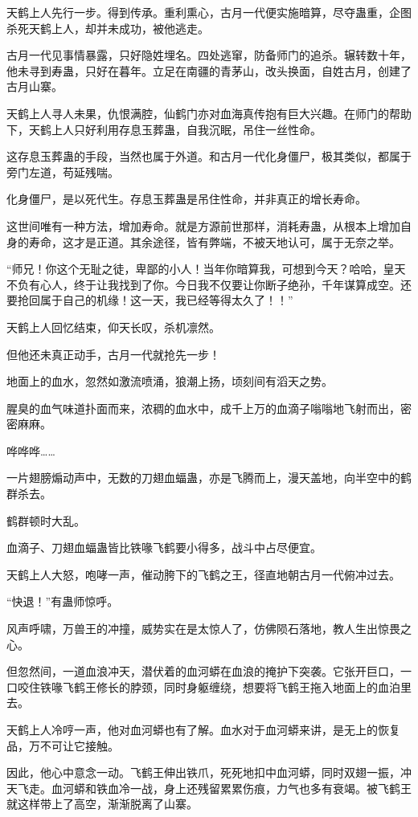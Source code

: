 \begin{this_body}
天鹤上人先行一步。得到传承。重利熏心，古月一代便实施暗算，尽夺蛊重，企图杀死天鹤上人，却并未成功，被他逃走。

古月一代见事情暴露，只好隐姓埋名。四处逃窜，防备师门的追杀。辗转数十年，他未寻到寿蛊，只好在暮年。立足在南疆的青茅山，改头换面，自姓古月，创建了古月山寨。

天鹤上人寻人未果，仇恨满腔，仙鹤门亦对血海真传抱有巨大兴趣。在师门的帮助下，天鹤上人只好利用存息玉葬蛊，自我沉眠，吊住一丝性命。

这存息玉葬蛊的手段，当然也属于外道。和古月一代化身僵尸，极其类似，都属于旁门左道，苟延残喘。

化身僵尸，是以死代生。存息玉葬蛊是吊住性命，并非真正的增长寿命。

这世间唯有一种方法，增加寿命。就是方源前世那样，消耗寿蛊，从根本上增加自身的寿命，这才是正道。其余途径，皆有弊端，不被天地认可，属于无奈之举。

“师兄！你这个无耻之徒，卑鄙的小人！当年你暗算我，可想到今天？哈哈，皇天不负有心人，终于让我找到了你。今日我不仅要让你断子绝孙，千年谋算成空。还要抢回属于自己的机缘！这一天，我已经等得太久了！！”

天鹤上人回忆结束，仰天长叹，杀机凛然。

但他还未真正动手，古月一代就抢先一步！

地面上的血水，忽然如激流喷涌，狼潮上扬，顷刻间有滔天之势。

腥臭的血气味道扑面而来，浓稠的血水中，成千上万的血滴子嗡嗡地飞射而出，密密麻麻。

哗哗哗……

一片翅膀煽动声中，无数的刀翅血蝠蛊，亦是飞腾而上，漫天盖地，向半空中的鹤群杀去。

鹤群顿时大乱。

血滴子、刀翅血蝠蛊皆比铁喙飞鹤要小得多，战斗中占尽便宜。

天鹤上人大怒，咆哮一声，催动胯下的飞鹤之王，径直地朝古月一代俯冲过去。

“快退！”有蛊师惊呼。

风声呼啸，万兽王的冲撞，威势实在是太惊人了，仿佛陨石落地，教人生出惊畏之心。

但忽然间，一道血浪冲天，潜伏着的血河蟒在血浪的掩护下突袭。它张开巨口，一口咬住铁喙飞鹤王修长的脖颈，同时身躯缠绕，想要将飞鹤王拖入地面上的血泊里去。

天鹤上人冷哼一声，他对血河蟒也有了解。血水对于血河蟒来讲，是无上的恢复品，万不可让它接触。

因此，他心中意念一动。飞鹤王伸出铁爪，死死地扣中血河蟒，同时双翅一振，冲天飞走。血河蟒和铁血冷一战，身上还残留累累伤痕，力气也多有衰竭。被飞鹤王就这样带上了高空，渐渐脱离了山寨。


\end{this_body}
